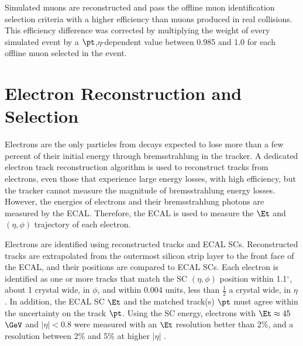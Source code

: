 Simulated muons are reconstructed and pass the offline muon identification selection criteria with a higher 
efficiency than muons produced in real collisions.  This efficiency difference was corrected by multiplying the weight of every 
simulated event by a $\pt$,$\eta$-dependent value between 0.985 and 1.0 for each offline muon selected in the event.


\section{Electron Reconstruction and Selection}
\label{sec:eleReco}

Electrons are the only particles from \WR decays expected to lose more than a few percent of their initial energy through 
bremsstrahlung in the tracker.  A dedicated electron track reconstruction algorithm is used to reconstruct tracks from electrons, 
even those that experience large energy losses, with high efficiency, but the tracker cannot measure the magnitude of bremsstrahlung 
energy losses.  However, the energies of electrons and their bremsstrahlung photons are measured by the ECAL.  Therefore, the ECAL 
is used to measure the $\Et$ and $(\eta,\phi)$ trajectory of each electron.

Electrons are identified using reconstructed tracks and ECAL SCs.  Reconstructed tracks are extrapolated from the outermost 
silicon strip layer to the front face of the ECAL, and their positions are compared to ECAL SCs.  Each electron is identified 
as one or more tracks that match the SC $(\eta,\phi)$ position within 1.1$^{\circ}$, about 1 crystal wide, in $\phi$, and 
within 0.004 units, less than $\frac{1}{2}$ a crystal wide, in $\eta$.  In addition, the ECAL SC $\Et$ and the matched 
track(s) $\pt$ must agree within the uncertainty on the track $\pt$.  Using the SC energy, electrons with $\Et \approx 45$ 
$\GeV$ and $|\eta| < 0.8$ were measured with an $\Et$ resolution better than 2\%, and a resolution between 2\% and 5\% 
at higher $|\eta|$ \cite{ecalPerformanceInCollisions}.

